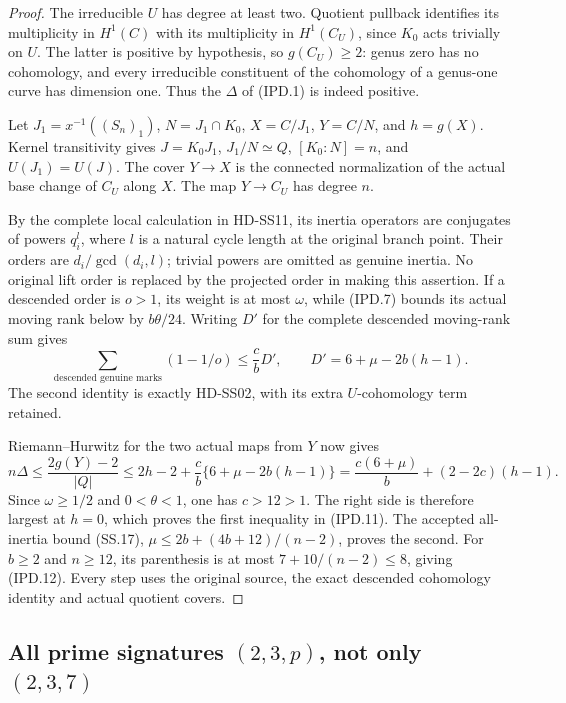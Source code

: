 \begin{proof}
The irreducible \(U\) has degree at least two. Quotient pullback
identifies its multiplicity in \(H^1(C)\) with its multiplicity
in \(H^1(C_U)\), since \(K_0\) acts trivially on \(U\).
The latter is positive by hypothesis, so \(g(C_U)\ge2\): genus zero has no cohomology,
and every irreducible constituent of the cohomology of a
genus-one curve has dimension one. Thus the \(\Delta\) of
(IPD.1) is indeed positive.

Let \(J_1=x^{-1}((S_n)_1)\), \(N=J_1\cap K_0\),
\(X=C/J_1\), \(Y=C/N\), and \(h=g(X)\).
Kernel transitivity gives \(J=K_0J_1\),
\(J_1/N\simeq Q\), \([K_0:N]=n\), and
\(U(J_1)=U(J)\). The cover \(Y\to X\) is the connected
normalization of the actual base change of \(C_U\) along \(X\).
The map \(Y\to C_U\) has degree \(n\).

By the complete local calculation in HD-SS11, its inertia
operators are conjugates of powers \(q_i^l\), where \(l\)
is a natural cycle length at the original branch point. Their
orders are \(d_i/\gcd(d_i,l)\); trivial powers are omitted
as genuine inertia. No original lift order is replaced by
the projected order in making this assertion. If a descended
order is \(o>1\), its weight is at most \(\omega\), while
(IPD.7) bounds its actual moving rank below by \(b\theta/24\).
Writing \(D'\) for the complete descended moving-rank sum gives
\[
 \sum_{\text{descended genuine marks}}(1-1/o)
 \le\frac cb D',\qquad
                  D'=6+\mu-2b(h-1).
 \tag{IPD.13}
\]
The second identity is exactly HD-SS02, with its extra
\(U\)-cohomology term retained.

Riemann--Hurwitz for the two actual maps from \(Y\) now gives
\[
 n\Delta\le\frac{2g(Y)-2}{|Q|}
 \le2h-2+\frac cb\{6+\mu-2b(h-1)\}
 =\frac{c(6+\mu)}b+(2-2c)(h-1).
 \tag{IPD.14}
\]
Since \(\omega\ge1/2\) and \(0<\theta<1\), one has
\(c>12>1\). The right side is therefore largest at \(h=0\),
which proves the first inequality in (IPD.11).
The accepted all-inertia bound (SS.17),
\(\mu\le2b+(4b+12)/(n-2)\), proves the second.
For \(b\ge2\) and \(n\ge12\), its parenthesis is at most
\(7+10/(n-2)\le8\), giving (IPD.12).
Every step uses the original source, the exact descended
cohomology identity and actual quotient covers.
\end{proof}

\subsection*{All prime signatures \((2,3,p)\), not only \((2,3,7)\)}

